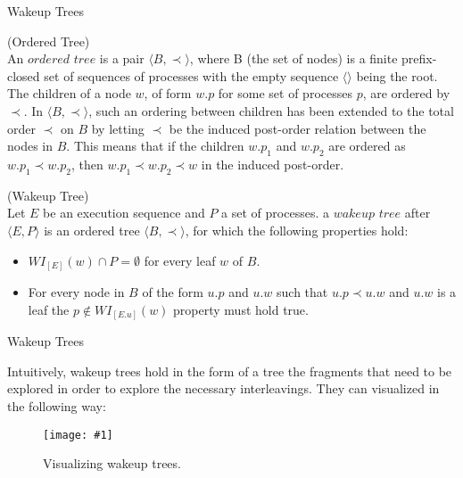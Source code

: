 \documentclass[9pt]{beamer}
\newcommand{\tracelonglong}[2]{
\begin{figure}[H]
\centering
\texttt{[image: \#1]}
\caption{#2}
\label{#2}
\end{figure}
}
\begin{document}
\begin{frame} {Wakeup Trees}


\begin{definition}{(Ordered Tree)}\label{def:Ordered}\\
An $ordered$ $tree$ is a pair $\langle B , \prec \rangle$, where B (the set of nodes) is a finite prefix-closed
    set of sequences of processes with the empty sequence $\langle\rangle$ being the root.
    The children of a node $w$, of form $w.p$ for some set of processes $p$, are ordered by $\prec$. 
    In $\langle B , \prec \rangle$, such an ordering between children has been extended to the total 
    order $\prec$ on $B$ by letting $\prec$ be the induced post-order relation between the nodes in $B$.
    This means that if the children $w.p_1$ and $w.p_2$ are ordered as $w.p_1 \prec w.p_2$,
    then $w.p_1 \prec w.p_2 \prec w $ in the induced post-order.
\end{definition}

\begin{definition}{(Wakeup Tree)}\\
    Let $E$ be an execution sequence and $P$ a set of processes. a $wakeup$ $tree$ after $\langle E , P \rangle$
    is an ordered tree $\langle B , \prec \rangle$, for which the following properties hold:
    \begin{itemize}
        \item $WI_{[E]}(w) \cap P = \emptyset$ for every leaf $w$ of $B$.
        \item For every node in $B$ of the form $u.p$ and $u.w$ such that $u.p \prec u.w$ and $u.w$ is a leaf
        the $p \not \in WI_{[E.u]}(w)$ property must hold true.
    \end{itemize}
\end{definition}

\end{frame}


\begin{frame} {Wakeup Trees}

Intuitively, wakeup trees hold in the form of a tree the fragments that
need to be explored in order to explore the necessary interleavings. They can visualized in the following way:

\tracelonglong{WuTExample.png}{Visualizing wakeup trees.}

\end{frame}
\end{document}
